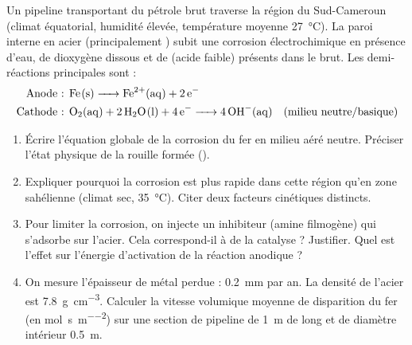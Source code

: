 \documentclass[11pt]{article}
\begin{document}
\begin{exercice}
Un pipeline transportant du pétrole brut traverse la région du Sud-Cameroun (climat équatorial, humidité élevée, température moyenne \SI{27}{\celsius}). La paroi interne en acier (principalement ) subit une corrosion électrochimique en présence d'eau, de dioxygène  dissous et de  (acide faible) présents dans le brut.
Les demi-réactions principales sont :
\begin{align*}
\text{Anode : } & \ce{Fe(s) -> Fe^{2+}(aq) + 2 e-} \\
\text{Cathode : } & \ce{O2(aq) + 2 H2O(l) + 4 e- -> 4 OH-(aq)} \quad (\text{milieu neutre/basique})
\end{align*}
\begin{enumerate}
\item Écrire l'équation globale de la corrosion du fer en milieu aéré neutre. Préciser l'état physique de la rouille formée ().
\item Expliquer pourquoi la corrosion est plus rapide dans cette région qu'en zone sahélienne (climat sec, \SI{35}{\celsius}). Citer deux facteurs cinétiques distincts.
\item Pour limiter la corrosion, on injecte un inhibiteur (amine filmogène) qui s'adsorbe sur l'acier. Cela correspond-il à de la catalyse ? Justifier. Quel est l'effet sur l'énergie d'activation de la réaction anodique ?
\item On mesure l'épaisseur de métal perdue : \SI{0,2}{\milli\meter} par an. La densité de l'acier est \SI{7,8}{\gram\per\centi\meter\cubed}. Calculer la vitesse volumique moyenne de disparition du fer (en \si{\mol\per\second\per\meter\squared}) sur une section de pipeline de \SI{1}{\meter} de long et de diamètre intérieur \SI{0,5}{\meter}.
\end{enumerate}
\end{exercice}
\end{document}
